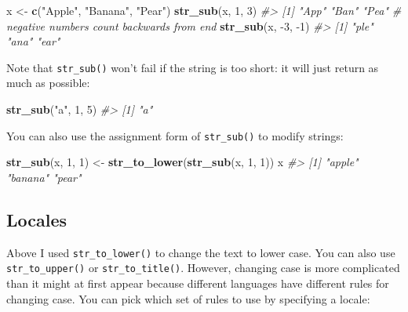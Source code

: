 \documentclass[]{book}
\newenvironment{Shaded}{\begin{snugshade}}{\end{snugshade}}
\newcommand{\KeywordTok}[1]{\textcolor[rgb]{0.13,0.29,0.53}{\textbf{{#1}}}}
\newcommand{\DecValTok}[1]{\textcolor[rgb]{0.00,0.00,0.81}{{#1}}}
\newcommand{\StringTok}[1]{\textcolor[rgb]{0.31,0.60,0.02}{{#1}}}
\newcommand{\CommentTok}[1]{\textcolor[rgb]{0.56,0.35,0.01}{\textit{{#1}}}}
\newcommand{\NormalTok}[1]{{#1}}
\begin{document}
\begin{Shaded}
\begin{Highlighting}[]
\NormalTok{x <-}\StringTok{ }\KeywordTok{c}\NormalTok{(}\StringTok{"Apple"}\NormalTok{, }\StringTok{"Banana"}\NormalTok{, }\StringTok{"Pear"}\NormalTok{)}
\KeywordTok{str_sub}\NormalTok{(x, }\DecValTok{1}\NormalTok{, }\DecValTok{3}\NormalTok{)}
\CommentTok{#> [1] "App" "Ban" "Pea"}
\CommentTok{# negative numbers count backwards from end}
\KeywordTok{str_sub}\NormalTok{(x, -}\DecValTok{3}\NormalTok{, -}\DecValTok{1}\NormalTok{)}
\CommentTok{#> [1] "ple" "ana" "ear"}
\end{Highlighting}
\end{Shaded}

Note that \texttt{str\_sub()} won't fail if the string is too short: it
will just return as much as possible:

\begin{Shaded}
\begin{Highlighting}[]
\KeywordTok{str_sub}\NormalTok{(}\StringTok{"a"}\NormalTok{, }\DecValTok{1}\NormalTok{, }\DecValTok{5}\NormalTok{)}
\CommentTok{#> [1] "a"}
\end{Highlighting}
\end{Shaded}

You can also use the assignment form of \texttt{str\_sub()} to modify
strings:

\begin{Shaded}
\begin{Highlighting}[]
\KeywordTok{str_sub}\NormalTok{(x, }\DecValTok{1}\NormalTok{, }\DecValTok{1}\NormalTok{) <-}\StringTok{ }\KeywordTok{str_to_lower}\NormalTok{(}\KeywordTok{str_sub}\NormalTok{(x, }\DecValTok{1}\NormalTok{, }\DecValTok{1}\NormalTok{))}
\NormalTok{x}
\CommentTok{#> [1] "apple"  "banana" "pear"}
\end{Highlighting}
\end{Shaded}

\subsection{Locales}\label{locales}

Above I used \texttt{str\_to\_lower()} to change the text to lower case.
You can also use \texttt{str\_to\_upper()} or \texttt{str\_to\_title()}.
However, changing case is more complicated than it might at first appear
because different languages have different rules for changing case. You
can pick which set of rules to use by specifying a locale:
\end{document}
